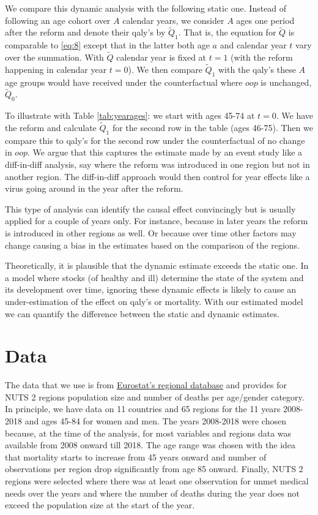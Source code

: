 \documentclass[a4paper,12pt]{article}
\begin{document}
We compare this dynamic analysis with the following static one. Instead of following an age cohort over \(A\) calendar years, we consider \(A\) ages one period after the reform and denote their qaly's by \(\tilde Q_1\). That is, the equation for \(\tilde Q\) is comparable to \eqref{eq:8} except that in the latter both age \(a\) and calendar year \(t\) vary over the summation. With \(\tilde Q\) calendar year is fixed at \(t=1\) (with the reform happening in calendar year \(t=0\)). We then compare \(\tilde Q_1\) with the qaly's these \(A\) age groups would have received under the counterfactual where \(oop\) is unchanged, \(\tilde Q_0\).

To illustrate with Table \ref{tab:yearages}: we start with ages 45-74 at \(t=0\). We have the reform and calculate \(\tilde Q_1\) for the second row in the table (ages 46-75). Then we compare this to qaly's for the second row under the counterfactual of no change in \(oop\). We argue that this captures the estimate made by an event study like a diff-in-diff analysis, say where the reform was introduced in one region but not in another region. The diff-in-diff approach would then control for year effects like a virus going around in the year after the reform.

This type of analysis can identify the causal effect convincingly but is usually applied for a couple of years only. For instance, because in later years the reform is introduced in other regions as well. Or because over time other factors may change causing a bias in the estimates based on the comparison of the regions.

Theoretically, it is plausible that the dynamic estimate exceeds the static one. In a model where stocks (of healthy and ill) determine the state of the system and its development over time, ignoring these dynamic effects is likely to cause an under-estimation of the effect on qaly's or mortality. With our estimated model we can quantify the difference between the static and dynamic estimates.
\section{Data}
\label{sec:orgb9cd79a}

The data that we use is from \href{https://ec.europa.eu/eurostat/web/regions/database}{Eurostat's regional database} and provides for NUTS 2 regions population size and number of deaths per age/gender category. In principle, we have data on 11 countries and 65 regions for the 11 years 2008-2018 and ages 45-84 for women and men. The years 2008-2018 were chosen  because, at the time of the analysis, for most variables and regions data was available from 2008 onward till 2018. The age range was chosen with the idea that mortality starts to increase from 45 years onward and number of observations per region drop significantly from age 85 onward. Finally, NUTS 2 regions were selected where there was at least one observation for unmet medical needs over the years and where the number of deaths during the year does not exceed the population size at the start of the year.
\end{document}
